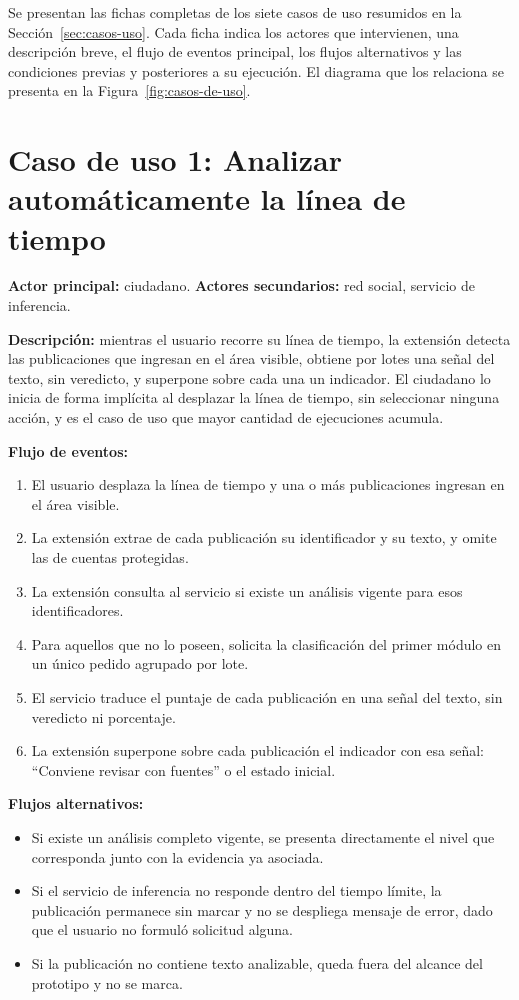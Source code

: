 \label{anexo:casos-uso}

Se presentan las fichas completas de los siete casos de uso resumidos en la Sección~\ref{sec:casos-uso}. Cada ficha indica los actores que intervienen, una descripción breve, el flujo de eventos principal, los flujos alternativos y las condiciones previas y posteriores a su ejecución. El diagrama que los relaciona se presenta en la Figura~\ref{fig:casos-de-uso}.

\section*{Caso de uso 1: Analizar automáticamente la línea de tiempo}

\textbf{Actor principal:} ciudadano. \textbf{Actores secundarios:} red social, servicio de inferencia.

\textbf{Descripción:} mientras el usuario recorre su línea de tiempo, la extensión detecta las publicaciones que ingresan en el área visible, obtiene por lotes una señal del texto, sin veredicto, y superpone sobre cada una un indicador. El ciudadano lo inicia de forma implícita al desplazar la línea de tiempo, sin seleccionar ninguna acción, y es el caso de uso que mayor cantidad de ejecuciones acumula.

\textbf{Flujo de eventos:}
\begin{enumerate}
  \item El usuario desplaza la línea de tiempo y una o más publicaciones ingresan en el área visible.
  \item La extensión extrae de cada publicación su identificador y su texto, y omite las de cuentas protegidas.
  \item La extensión consulta al servicio si existe un análisis vigente para esos identificadores.
  \item Para aquellos que no lo poseen, solicita la clasificación del primer módulo en un único pedido agrupado por lote.
  \item El servicio traduce el puntaje de cada publicación en una señal del texto, sin veredicto ni porcentaje.
  \item La extensión superpone sobre cada publicación el indicador con esa señal: \enquote{Conviene revisar con fuentes} o el estado inicial.
\end{enumerate}

\textbf{Flujos alternativos:}
\begin{itemize}
  \item Si existe un análisis completo vigente, se presenta directamente el nivel que corresponda junto con la evidencia ya asociada.
  \item Si el servicio de inferencia no responde dentro del tiempo límite, la publicación permanece sin marcar y no se despliega mensaje de error, dado que el usuario no formuló solicitud alguna.
  \item Si la publicación no contiene texto analizable, queda fuera del alcance del prototipo y no se marca.
\end{itemize}

